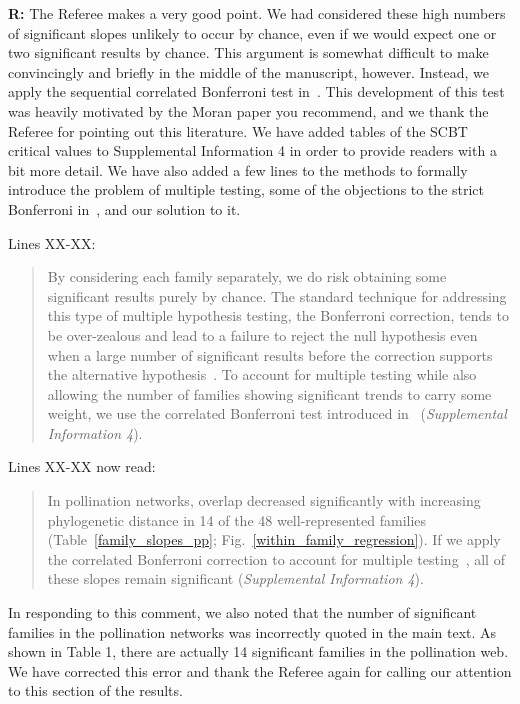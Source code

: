 \documentclass[12pt]{letter}
\begin{document}
		\textbf{R:} The Referee makes a very good point. We had considered these high numbers of significant slopes unlikely to occur by chance, even if we would expect one or two significant results by chance. This argument is somewhat difficult to make convincingly and briefly in the middle of the manuscript, however. Instead, we apply the sequential correlated Bonferroni test in~\citet{Drezner2016}. This development of this test was heavily motivated by the Moran paper you recommend, and we thank the Referee for pointing out this literature. We have added tables of the SCBT critical values to Supplemental Information 4 in order to provide readers with a bit more detail. We have also added a few lines to the methods to formally introduce the problem of multiple testing, some of the objections to the strict Bonferroni in~\citet{Moran2003}, and our solution to it.


		Lines XX-XX:

		\begin{quotation}

			By considering each family separately, we do risk obtaining some significant results purely by chance. The standard technique for addressing this type of multiple hypothesis testing, the Bonferroni correction, tends to be over-zealous and lead to a failure to reject the null hypothesis even when a large number of significant results before the correction supports the alternative hypothesis~\citep{Moran2003}. To account for multiple testing while also allowing the number of families showing significant trends to carry some weight, we use the correlated Bonferroni test introduced in~\citet{Drezler2016} (\emph{Supplemental Information 4}).

		\end{quotation}


		Lines XX-XX now read:

		\begin{quotation}
			 In pollination networks, overlap decreased significantly with increasing phylogenetic distance in 14 of the 48 well-represented families (Table~\ref{family_slopes_pp}; Fig.~\ref{within_family_regression}). If we apply the correlated Bonferroni correction to account for multiple testing~\citep{Drezner2016}, all of these slopes remain significant (\emph{Supplemental Information 4}).
		\end{quotation}


		In responding to this comment, we also noted that the number of significant families in the pollination networks was incorrectly quoted in the main text. As shown in Table 1, there are actually 14 significant families in the pollination web. We have corrected this error and thank the Referee again for calling our attention to this section of the results.
\end{document}

